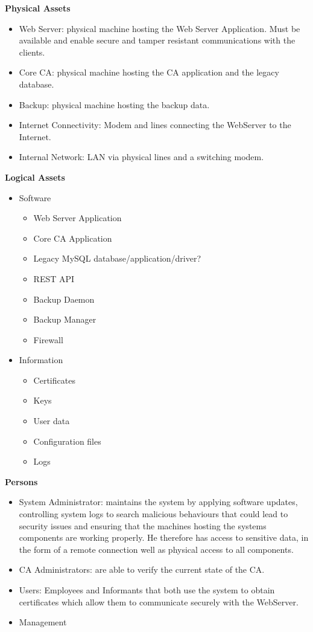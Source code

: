\documentclass[english]{article}
\begin{document}

\textbf{Physical Assets}
\begin{itemize}
\item Web Server: physical machine hosting the Web Server Application. Must be available and enable secure and tamper resistant communications with the clients.
\item Core CA: physical machine hosting the CA application and the legacy database.
\item Backup: physical machine hosting the backup data.
\item Internet Connectivity: Modem and lines connecting the WebServer to the Internet.
\item Internal Network: LAN via physical lines and a switching modem.
\end{itemize}

\noindent\textbf{Logical Assets}
\begin{itemize}
    \item Software
    \begin{itemize}
    \item Web Server Application
        \item Core CA Application
        \item Legacy MySQL database/application/driver?
        \item REST API
        \item Backup Daemon
        \item Backup Manager
        \item Firewall
    \end{itemize}
    \item Information
    \begin{itemize}
        \item Certificates
        \item Keys
        \item User data
        \item Configuration files
        \item Logs
    \end{itemize}
\end{itemize}


\noindent\textbf{Persons}
\begin{itemize}
\item System Administrator: maintains the system by applying software updates, controlling system logs to search malicious behaviours that could lead to security issues and ensuring that the machines hosting the systems components are working properly. He therefore has access to sensitive data, in the form of a remote connection well as physical access to all components.
\item CA Administrators: are able to verify the current state of the CA.
\item Users: Employees and Informants that both use the system to obtain certificates which allow them to communicate securely with the WebServer.
\item Management
\end{itemize}
\end{document}
